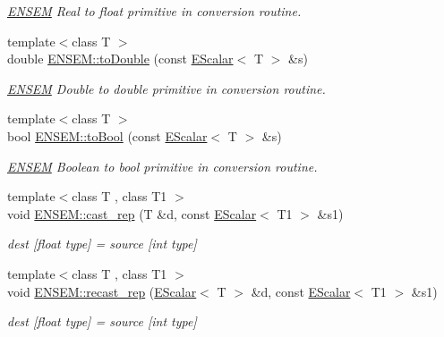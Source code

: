 \begin{DoxyCompactItemize}
\begin{DoxyCompactList}\small\item\em \mbox{\hyperlink{namespaceENSEM}{E\+N\+S\+EM}} Real to float primitive in conversion routine. \end{DoxyCompactList}\item 
{\footnotesize template$<$class T $>$ }\\double \mbox{\hyperlink{group__escalar_ga981890bacedbaccd67983030f792d927}{E\+N\+S\+E\+M\+::to\+Double}} (const \mbox{\hyperlink{classENSEM_1_1EScalar}{E\+Scalar}}$<$ T $>$ \&s)
\begin{DoxyCompactList}\small\item\em \mbox{\hyperlink{namespaceENSEM}{E\+N\+S\+EM}} Double to double primitive in conversion routine. \end{DoxyCompactList}\item 
{\footnotesize template$<$class T $>$ }\\bool \mbox{\hyperlink{group__escalar_ga67754bbbfd7795820548f6c6bb9c6b19}{E\+N\+S\+E\+M\+::to\+Bool}} (const \mbox{\hyperlink{classENSEM_1_1EScalar}{E\+Scalar}}$<$ T $>$ \&s)
\begin{DoxyCompactList}\small\item\em \mbox{\hyperlink{namespaceENSEM}{E\+N\+S\+EM}} Boolean to bool primitive in conversion routine. \end{DoxyCompactList}\item 
{\footnotesize template$<$class T , class T1 $>$ }\\void \mbox{\hyperlink{group__escalar_ga1fe36c2ff072b322fac723a4e44f6584}{E\+N\+S\+E\+M\+::cast\+\_\+rep}} (T \&d, const \mbox{\hyperlink{classENSEM_1_1EScalar}{E\+Scalar}}$<$ T1 $>$ \&s1)
\begin{DoxyCompactList}\small\item\em dest \mbox{[}float type\mbox{]} = source \mbox{[}int type\mbox{]} \end{DoxyCompactList}\item 
{\footnotesize template$<$class T , class T1 $>$ }\\void \mbox{\hyperlink{group__escalar_ga49ac1b22b18f5dd54cdf91fbf9a4e3b2}{E\+N\+S\+E\+M\+::recast\+\_\+rep}} (\mbox{\hyperlink{classENSEM_1_1EScalar}{E\+Scalar}}$<$ T $>$ \&d, const \mbox{\hyperlink{classENSEM_1_1EScalar}{E\+Scalar}}$<$ T1 $>$ \&s1)
\begin{DoxyCompactList}\small\item\em dest \mbox{[}float type\mbox{]} = source \mbox{[}int type\mbox{]} \end{DoxyCompactList}\item 

\end{DoxyCompactItemize}
